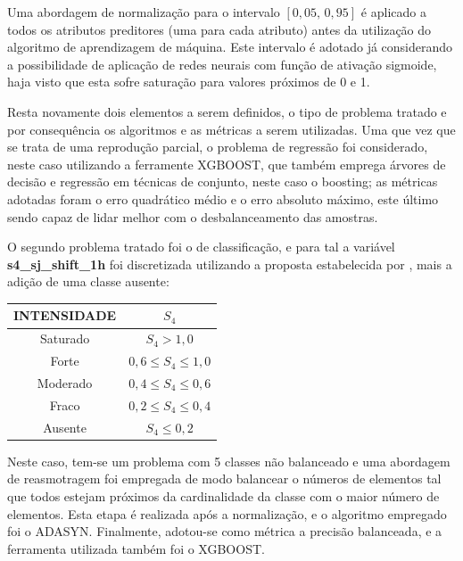 Uma abordagem de normalização para o intervalo $[0,05,\,0,95]$ é aplicado a todos os atributos preditores (uma para cada atributo) antes da utilização do algoritmo de aprendizagem de máquina. Este intervalo é adotado já considerando a possibilidade de aplicação de redes neurais com função de ativação sigmoide, haja visto que esta sofre saturação para valores próximos de 0 e 1.

Resta novamente dois elementos a serem definidos, o tipo de problema tratado e por consequência os algoritmos e as métricas a serem utilizadas. Uma que vez que se trata de uma reprodução parcial, o problema de regressão foi considerado, neste caso utilizando a ferramente XGBOOST, que também emprega árvores de decisão e regressão em técnicas de conjunto, neste caso o boosting; as métricas adotadas foram o erro quadrático médio e o erro absoluto máximo, este último sendo capaz de lidar melhor com o desbalanceamento das amostras.

O segundo problema tratado foi o de classificação, e para tal a variável {\bf s4\_sj\_shift\_1h} foi discretizada utilizando a proposta estabelecida por \cite{MUELLA:2008}, mais a adição de uma classe ausente:

\begin{table}[H]
\begin{center}
\begin{tabular}{|c|c|}
\hline
{\bf INTENSIDADE} & {\bf $S_4$} \\ \hline
Saturado          & $S_4 > 1,0$ \\ \hline
Forte             & $0,6 \le S_4 \le 1,0$ \\ \hline
Moderado          & $0,4 \le S_4 \le 0,6$ \\ \hline
Fraco             & $0,2 \le S_4 \le 0,4$ \\ \hline
Ausente           & $ S_4 \le 0,2 $ \\ \hline
\end{tabular}
\end{center}
\end{table}

Neste caso, tem-se um problema com 5 classes não balanceado e uma abordagem de reasmotragem foi empregada de modo balancear o números de elementos tal que todos estejam próximos da cardinalidade da classe com o maior número de elementos. Esta etapa é realizada após a normalização, e o algoritmo empregado foi o ADASYN. Finalmente, adotou-se como métrica a precisão balanceada, e a ferramenta utilizada também foi o XGBOOST.

